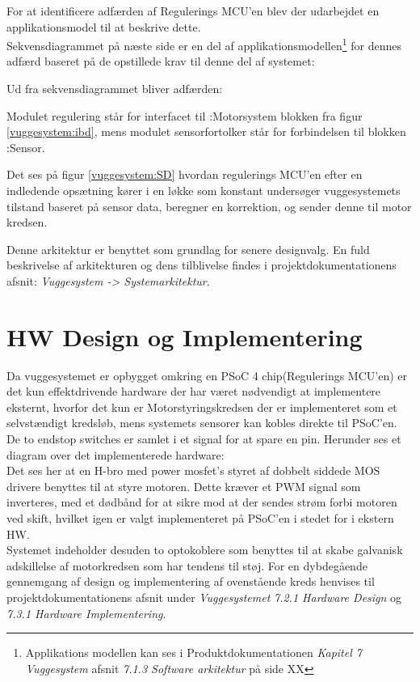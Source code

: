 For at identificere adfærden af Regulerings MCU'en blev der udarbejdet en applikationsmodel til at beskrive dette.\\Sekvensdiagrammet på næste side er en del af applikationsmodellen\footnote{Applikations modellen kan ses i Produktdokumentationen \textit{Kapitel 7 Vuggesystem} afsnit \textit{7.1.3 Software arkitektur} på side XX} for dennes adfærd baseret på de opstillede krav til denne del af systemet:


Ud fra sekvensdiagrammet bliver adfærden:

Modulet regulering står for interfacet til :Motorsystem blokken fra figur \ref{vuggesystem:ibd}, mens modulet sensorfortolker står for forbindelsen til blokken :Sensor.

Det ses på figur \ref{vuggesystem:SD} hvordan regulerings MCU'en efter en indledende opsætning kører i en løkke som konstant undersøger vuggesystemets tilstand baseret på sensor data, beregner en korrektion, og sender denne til motor kredsen.

Denne arkitektur er benyttet som grundlag for senere designvalg. En fuld beskrivelse af arkitekturen og dens tilblivelse findes i projektdokumentationens afsnit: \textit{Vuggesystem -> Systemarkitektur}.

\newpage
\section{HW Design og Implementering}
\label{vs_HW}
Da vuggesystemet er opbygget omkring en PSoC 4 chip(Regulerings MCU'en) er det kun effektdrivende hardware der har været nødvendigt at implementere eksternt, hvorfor det kun er Motorstyringskredsen der er implementeret som et selvstændigt kredsløb, mens systemets sensorer kan kobles direkte til PSoC'en. De to endstop switches er samlet i et signal for at spare en pin. Herunder ses et diagram over det implementerede hardware:\\
Det ses her at en H-bro med power mosfet's styret af dobbelt siddede MOS drivere benyttes til at styre motoren. Dette kræver et PWM signal som inverteres, med et dødbånd for at sikre mod at der sendes strøm forbi motoren ved skift, hvilket igen er valgt implementeret på PSoC'en i stedet for i ekstern HW. \\ Systemet indeholder desuden to optokoblere som benyttes til at skabe galvanisk adskillelse af motorkredsen som har tendens til støj.
For en dybdegående gennemgang af design og implementering af ovenstående kreds henvises til projektdokumentationens afsnit under \textit{Vuggesystemet} \textit{7.2.1 Hardware Design} og \textit{7.3.1 Hardware Implementering}.\\



